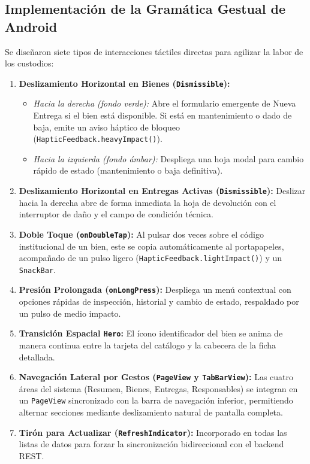 \documentclass[12pt,a4paper]{article}
\begin{document}
\subsection{Implementación de la Gramática Gestual de Android}
Se diseñaron siete tipos de interacciones táctiles directas para agilizar la labor de los custodios:

\begin{enumerate}
    \item \textbf{Deslizamiento Horizontal en Bienes (\texttt{Dismissible}):}
    \begin{itemize}
        \item \textit{Hacia la derecha (fondo verde):} Abre el formulario emergente de Nueva Entrega si el bien está disponible. Si está en mantenimiento o dado de baja, emite un aviso háptico de bloqueo (\texttt{HapticFeedback.heavyImpact()}).
        \item \textit{Hacia la izquierda (fondo ámbar):} Despliega una hoja modal para cambio rápido de estado (mantenimiento o baja definitiva).
    \end{itemize}
    \item \textbf{Deslizamiento Horizontal en Entregas Activas (\texttt{Dismissible}):} Deslizar hacia la derecha abre de forma inmediata la hoja de devolución con el interruptor de daño y el campo de condición técnica.
    \item \textbf{Doble Toque (\texttt{onDoubleTap}):} Al pulsar dos veces sobre el código institucional de un bien, este se copia automáticamente al portapapeles, acompañado de un pulso ligero (\texttt{HapticFeedback.lightImpact()}) y un \texttt{SnackBar}.
    \item \textbf{Presión Prolongada (\texttt{onLongPress}):} Despliega un menú contextual con opciones rápidas de inspección, historial y cambio de estado, respaldado por un pulso de medio impacto.
    \item \textbf{Transición Espacial \texttt{Hero}:} El ícono identificador del bien se anima de manera continua entre la tarjeta del catálogo y la cabecera de la ficha detallada.
    \item \textbf{Navegación Lateral por Gestos (\texttt{PageView} y \texttt{TabBarView}):} Las cuatro áreas del sistema (Resumen, Bienes, Entregas, Responsables) se integran en un \texttt{PageView} sincronizado con la barra de navegación inferior, permitiendo alternar secciones mediante deslizamiento natural de pantalla completa.
    \item \textbf{Tirón para Actualizar (\texttt{RefreshIndicator}):} Incorporado en todas las listas de datos para forzar la sincronización bidireccional con el backend REST.
\end{enumerate}
\end{document}
